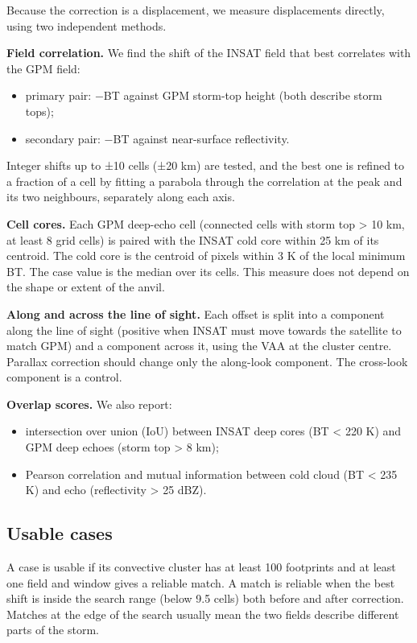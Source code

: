 Because the correction is a displacement, we measure displacements directly, using two independent methods.

\textbf{Field correlation.} We find the shift of the INSAT field that best correlates with the GPM field:

\begin{itemize}
\tightlist
\item
  primary pair: \(-\)BT against GPM storm-top height (both describe storm tops);
\item
  secondary pair: \(-\)BT against near-surface reflectivity.
\end{itemize}

Integer shifts up to ±10 cells (±20 km) are tested, and the best one is refined to a fraction of a cell by fitting a parabola through the correlation at the peak and its two neighbours, separately along each axis.

\textbf{Cell cores.} Each GPM deep-echo cell (connected cells with storm top \textgreater{} 10 km, at least 8 grid cells) is paired with the INSAT cold core within 25 km of its centroid. The cold core is the centroid of pixels within 3 K of the local minimum BT. The case value is the median over its cells. This measure does not depend on the shape or extent of the anvil.

\textbf{Along and across the line of sight.} Each offset is split into a component along the line of sight (positive when INSAT must move towards the satellite to match GPM) and a component across it, using the VAA at the cluster centre. Parallax correction should change only the along-look component. The cross-look component is a control.

\textbf{Overlap scores.} We also report:

\begin{itemize}
\tightlist
\item
  intersection over union (IoU) between INSAT deep cores (BT \textless{} 220 K) and GPM deep echoes (storm top \textgreater{} 8 km);
\item
  Pearson correlation and mutual information between cold cloud (BT \textless{} 235 K) and echo (reflectivity \textgreater{} 25 dBZ).
\end{itemize}

\subsection{Usable cases}\label{sec:4.4}

A case is usable if its convective cluster has at least 100 footprints and at least one field and window gives a reliable match. A match is reliable when the best shift is inside the search range (below 9.5 cells) both before and after correction. Matches at the edge of the search usually mean the two fields describe different parts of the storm.

